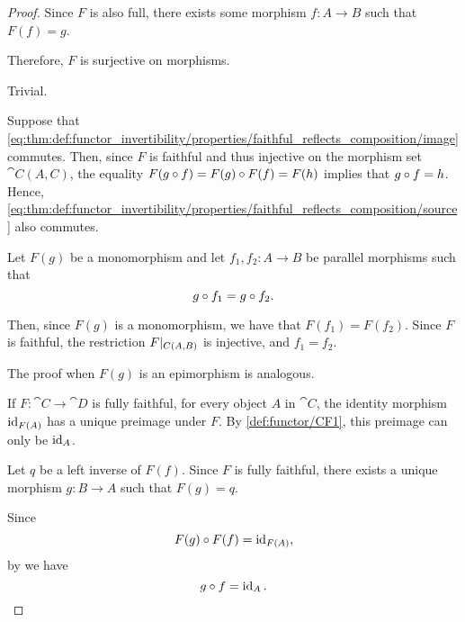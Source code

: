 \begin{proof}
  Since \( F \) is also full, there exists some morphism \( f: A \to B \) such that \( F(f) = g \).

  Therefore, \( F \) is surjective on morphisms.

   Trivial.

   Suppose that \eqref{eq:thm:def:functor_invertibility/properties/faithful_reflects_composition/image} commutes. Then, since \( F \) is faithful and thus injective on the morphism set \( \cat{C}(A, C) \), the equality \( F(g \bincirc f) = F(g) \bincirc F(f) = F(h) \) implies that \( g \bincirc f = h \). Hence, \eqref{eq:thm:def:functor_invertibility/properties/faithful_reflects_composition/source} also commutes.

   Let \( F(g) \) be a monomorphism and let \( f_1, f_2: A \to B \) be parallel morphisms such that
  \begin{equation*}
    g \bincirc f_1 = g \bincirc f_2.
  \end{equation*}

  Then, since \( F(g) \) is a monomorphism, we have that \( F(f_1) = F(f_2) \). Since \( F \) is faithful, the restriction \( F\vert_{C(A, B)} \) is injective, and \( f_1 = f_2 \).

  The proof when \( F(g) \) is an epimorphism is analogous.

   If \( F: \cat{C} \to \cat{D} \) is fully faithful, for every object \( A \) in \( \cat{C} \), the identity morphism \( \operatorname{id}_{F(A)} \) has a unique preimage under \( F \). By \ref{def:functor/CF1}, this preimage can only be \( \operatorname{id}_A \).

   Let \( q \) be a left inverse of \( F(f) \). Since \( F \) is fully faithful, there exists a unique morphism \( g: B \to A \) such that \( F(g) = q \).

  Since
  \begin{equation*}
    F(g) \bincirc F(f) = \id_{F(A)},
  \end{equation*}
  by  we have
  \begin{equation*}
    g \bincirc f = \id_A.
  \end{equation*}


\end{proof}
